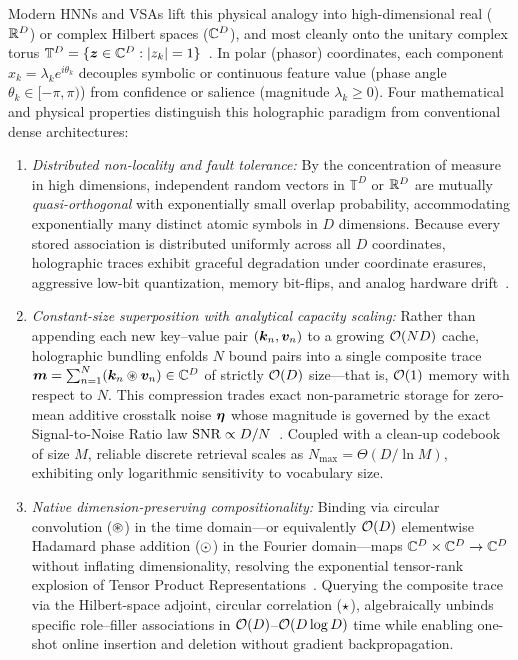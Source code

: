 Modern HNNs and VSAs lift this physical analogy into high-dimensional real ($\mathbb{R}^D$) or complex Hilbert spaces ($\mathbb{C}^D$), and most cleanly onto the unitary complex torus $\mathbb{T}^D = \{\boldsymbol{z} \in \mathbb{C}^D : \left\lvert z_k \right\rvert = 1\}$~\cite{SUTHERLAND_1990_HNN,PLATE_1995_HRR,KANERVA_2009_HDC}.
In polar (phasor) coordinates, each component $x_k = \lambda_k e^{i\theta_k}$ decouples symbolic or continuous feature value (phase angle $\theta_k \in [-\pi, \pi)$) from confidence or salience (magnitude $\lambda_k \ge 0$).
Four mathematical and physical properties distinguish this holographic paradigm from conventional dense architectures:
\begin{enumerate}
    \item \emph{Distributed non-locality and fault tolerance:} By the concentration of measure in high dimensions, independent random vectors in $\mathbb{T}^D$ or $\mathbb{R}^D$ are mutually \emph{quasi-orthogonal} with exponentially small overlap probability, accommodating exponentially many distinct atomic symbols in $D$ dimensions. Because every stored association is distributed uniformly across all $D$ coordinates, holographic traces exhibit graceful degradation under coordinate erasures, aggressive low-bit quantization, memory bit-flips, and analog hardware drift~\cite{KANERVA_2009_HDC,KARUNARATNE_2020_PCM_HDC}.
    \item \emph{Constant-size superposition with analytical capacity scaling:} Rather than appending each new key--value pair $(\boldsymbol{k}_n, \boldsymbol{v}_n)$ to a growing $\mathcal{O}\!\left(ND\right)$ cache, holographic bundling enfolds $N$ bound pairs into a single composite trace $\boldsymbol{m} = \sum_{n=1}^{N} (\boldsymbol{k}_n \circledast \boldsymbol{v}_n) \in \mathbb{C}^D$ of strictly $\mathcal{O}\!\left(D\right)$ size---that is, $\mathcal{O}\!\left(1\right)$ memory with respect to $N$. This compression trades exact non-parametric storage for zero-mean additive crosstalk noise $\boldsymbol{\eta}$ whose magnitude is governed by the exact Signal-to-Noise Ratio law $\mathrm{SNR} \propto D/N$~\cite{PLATE_1995_HRR,FRADY_CAPACITY_VSA}. Coupled with a clean-up codebook of size $M$, reliable discrete retrieval scales as $N_{\max} = \Theta(D / \ln M)$, exhibiting only logarithmic sensitivity to vocabulary size.
    \item \emph{Native dimension-preserving compositionality:} Binding via circular convolution ($\circledast$) in the time domain---or equivalently $\mathcal{O}\!\left(D\right)$ elementwise Hadamard phase addition ($\odot$) in the Fourier domain---maps $\mathbb{C}^D \times \mathbb{C}^D \to \mathbb{C}^D$ without inflating dimensionality, resolving the exponential tensor-rank explosion of Tensor Product Representations~\cite{SMOLENSKY_1990_TPR,PLATE_1995_HRR}. Querying the composite trace via the Hilbert-space adjoint, circular correlation ($\star$), algebraically unbinds specific role--filler associations in $\mathcal{O}\!\left(D\right)$--$\mathcal{O}\!\left(D \log D\right)$ time while enabling one-shot online insertion and deletion without gradient backpropagation.

\end{enumerate}
